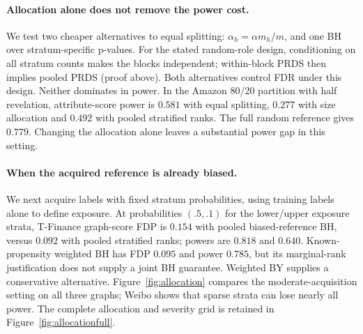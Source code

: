 \paragraph{Allocation alone does not remove the power cost.}
We test two cheaper alternatives to equal splitting: $\alpha_h=\alpha m_h/m$, and one BH over stratum-specific p-values. For the stated random-role design, conditioning on all stratum counts makes the blocks independent; within-block PRDS then implies pooled PRDS (proof above). Both alternatives control FDR under this design. Neither dominates in power. In the Amazon 80/20 partition with half revelation, attribute-score power is $0.581$ with equal splitting, $0.277$ with size allocation and $0.492$ with pooled stratified ranks. The full random reference gives $0.779$. Changing the allocation alone leaves a substantial power gap in this setting.

\paragraph{When the acquired reference is already biased.}
We next acquire labels with fixed stratum probabilities, using training labels alone to define exposure. At probabilities $(.5,.1)$ for the lower/upper exposure strata, T-Finance graph-score FDP is $0.154$ with pooled biased-reference BH, versus $0.092$ with pooled stratified ranks; powers are $0.818$ and $0.640$. Known-propensity weighted BH has FDP $0.095$ and power $0.785$, but its marginal-rank justification does not supply a joint BH guarantee. Weighted BY supplies a conservative alternative. Figure~\ref{fig:allocation} compares the moderate-acquisition setting on all three graphs; Weibo shows that sparse strata can lose nearly all power. The complete allocation and severity grid is retained in Figure~\ref{fig:allocationfull}.
